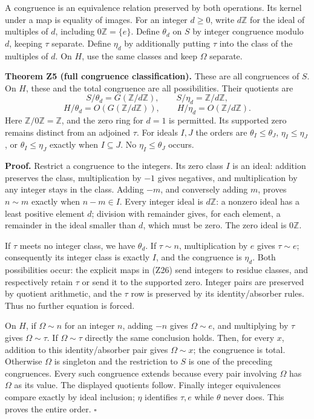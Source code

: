 \documentclass[
]{article}
\begin{document}
A congruence is an equivalence relation preserved by both operations.
Its kernel under a map is equality of images. For an integer \(d\ge0\),
write \(d\mathbb Z\) for the ideal of multiples of \(d\), including
\(0\mathbb Z=\{e\}\). Define \(\theta_d\) on \(S\) by integer congruence
modulo \(d\), keeping \(\tau\) separate. Define \(\eta_d\) by
additionally putting \(\tau\) into the class of the multiples of \(d\).
On \(H\), use the same classes and keep \(\Omega\) separate.

\textbf{Theorem Z5 (full congruence classification).} These are all
congruences of \(S\). On \(H\), these and the total congruence are all
possibilities. Their quotients are \[
S/\theta_d=G(\mathbb Z/d\mathbb Z),\qquad
S/\eta_d=\mathbb Z/d\mathbb Z,
\] \[
H/\theta_d=O(G(\mathbb Z/d\mathbb Z)),\qquad
H/\eta_d=O(\mathbb Z/d\mathbb Z).
\tag{Z26}
\] Here \(\mathbb Z/0\mathbb Z=\mathbb Z\), and the zero ring for
\(d=1\) is permitted. Its supported zero remains distinct from an
adjoined \(\tau\). For ideals \(I,J\) the orders are
\(\theta_I\le\theta_J\), \(\eta_I\le\eta_J\), or \(\theta_I\le\eta_J\)
exactly when \(I\subseteq J\). No \(\eta_I\le\theta_J\) occurs.

\textbf{Proof.} Restrict a congruence to the integers. Its zero class
\(I\) is an ideal: addition preserves the class, multiplication by
\(-1\) gives negatives, and multiplication by any integer stays in the
class. Adding \(-m\), and conversely adding \(m\), proves \(n\sim m\)
exactly when \(n-m\in I\). Every integer ideal is \(d\mathbb Z\): a
nonzero ideal has a least positive element \(d\); division with
remainder gives, for each element, a remainder in the ideal smaller than
\(d\), which must be zero. The zero ideal is \(0\mathbb Z\).

If \(\tau\) meets no integer class, we have \(\theta_d\). If
\(\tau\sim n\), multiplication by \(e\) gives \(\tau\sim e\);
consequently its integer class is exactly \(I\), and the congruence is
\(\eta_d\). Both possibilities occur: the explicit maps in (Z26) send
integers to residue classes, and respectively retain \(\tau\) or send it
to the supported zero. Integer pairs are preserved by quotient
arithmetic, and the \(\tau\) row is preserved by its identity/absorber
rules. Thus no further equation is forced.

On \(H\), if \(\Omega\sim n\) for an integer \(n\), adding \(-n\) gives
\(\Omega\sim e\), and multiplying by \(\tau\) gives \(\Omega\sim\tau\).
If \(\Omega\sim\tau\) directly the same conclusion holds. Then, for
every \(x\), addition to this identity/absorber pair gives
\(\Omega\sim x\); the congruence is total. Otherwise \(\Omega\) is
singleton and the restriction to \(S\) is one of the preceding
congruences. Every such congruence extends because every pair involving
\(\Omega\) has \(\Omega\) as its value. The displayed quotients follow.
Finally integer equivalences compare exactly by ideal inclusion;
\(\eta\) identifies \(\tau,e\) while \(\theta\) never does. This proves
the entire order. \(\square\)
\end{document}
